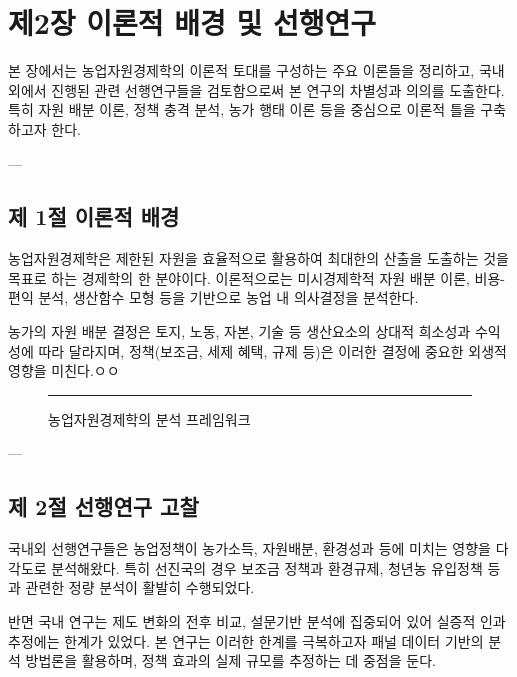 \chapter{제2장 이론적 배경 및 선행연구}

본 장에서는 농업자원경제학의 이론적 토대를 구성하는 주요 이론들을 정리하고,  
국내외에서 진행된 관련 선행연구들을 검토함으로써 본 연구의 차별성과 의의를 도출한다.  
특히 자원 배분 이론, 정책 충격 분석, 농가 행태 이론 등을 중심으로 이론적 틀을 구축하고자 한다.

---

\section{제 1절 이론적 배경}

농업자원경제학은 제한된 자원을 효율적으로 활용하여 최대한의 산출을 도출하는 것을 목표로 하는 경제학의 한 분야이다.  
이론적으로는 미시경제학적 자원 배분 이론, 비용-편익 분석, 생산함수 모형 등을 기반으로 농업 내 의사결정을 분석한다.

농가의 자원 배분 결정은 토지, 노동, 자본, 기술 등 생산요소의 상대적 희소성과 수익성에 따라 달라지며,  
정책(보조금, 세제 혜택, 규제 등)은 이러한 결정에 중요한 외생적 영향을 미친다.ㅇㅇ

\begin{figure}[htbp]
  \centering
  \rule{0.8\linewidth}{5cm} %
  \caption{농업자원경제학의 분석 프레임워크}\label{fig:chapter2_1}
\end{figure}

---

\section{제 2절 선행연구 고찰}

국내외 선행연구들은 농업정책이 농가소득, 자원배분, 환경성과 등에 미치는 영향을 다각도로 분석해왔다.  
특히 선진국의 경우 보조금 정책과 환경규제, 청년농 유입정책 등과 관련한 정량 분석이 활발히 수행되었다.  

반면 국내 연구는 제도 변화의 전후 비교, 설문기반 분석에 집중되어 있어 실증적 인과 추정에는 한계가 있었다.  
본 연구는 이러한 한계를 극복하고자 패널 데이터 기반의 분석 방법론을 활용하며,  
정책 효과의 실제 규모를 추정하는 데 중점을 둔다.


